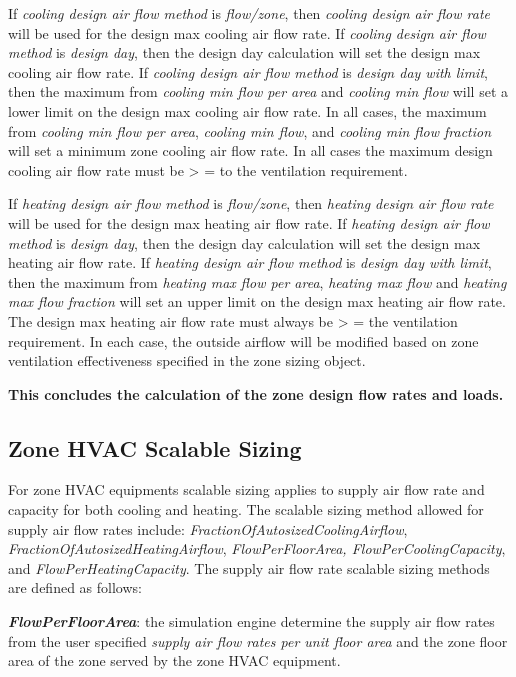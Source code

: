 If \emph{cooling design air flow method} is \emph{flow/zone}, then \emph{cooling design air flow rate} will be used for the design max cooling air flow rate. If \emph{cooling design air flow method} is \emph{design day}, then the design day calculation will set the design max cooling air flow rate. If \emph{cooling design air flow method} is \emph{design day with limit}, then the maximum from \emph{cooling min flow per area} and \emph{cooling min flow} will set a lower limit on the design max cooling air flow rate. In all cases, the maximum from \emph{cooling min flow per area}, \emph{cooling min flow}, and \emph{cooling min flow fraction} will set a minimum zone cooling air flow rate. In all cases the maximum design cooling air flow rate must be \textgreater{} = to the ventilation requirement.

If \emph{heating design air flow method} is \emph{flow/zone}, then \emph{heating design air flow rate} will be used for the design max heating air flow rate. If \emph{heating design air flow method} is \emph{design day}, then the design day calculation will set the design max heating air flow rate. If \emph{heating design air flow method} is \emph{design day with limit}, then the maximum from \emph{heating max flow per area}, \emph{heating max flow} and \emph{heating max flow fraction} will set an upper limit on the design max heating air flow rate. The design max heating air flow rate must always be \textgreater{} = the ventilation requirement. In each case, the outside airflow will be modified based on zone ventilation effectiveness specified in the zone sizing object.

\textbf{This concludes the calculation of the zone design flow rates and loads.}

\subsection{Zone HVAC Scalable Sizing}\label{zone-hvac-scalable-sizing}

For zone HVAC equipments scalable sizing applies to supply air flow rate and capacity for both cooling and heating. The scalable sizing method allowed for supply air flow rates include: \emph{FractionOfAutosizedCoolingAirflow}, \emph{FractionOfAutosizedHeatingAirflow}, \emph{FlowPerFloorArea, FlowPerCoolingCapacity}, and \emph{FlowPerHeatingCapacity}. The supply air flow rate scalable sizing methods are defined as follows:

\textbf{\emph{FlowPerFloorArea}}: the simulation engine determine the supply air flow rates from the user specified \emph{supply air flow rates per unit floor area} and the zone floor area of the zone served by the zone HVAC equipment.

